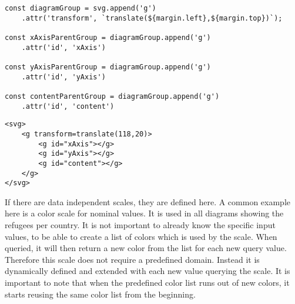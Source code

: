 \begin{minipage}{0.9\linewidth}
\begin{lstlisting}[style=htmlcssjs, captionpos=b, caption={JavaScript code to create the hierarchy as used in the bar-chart. The first line adds a new group element to themain SVG container using the \texttt{append} command. The newly added group element is saved in a constant for later references. Furthermore in line two an attribute is added to the new group element using the \texttt{attr} command and method chaining. It moves the group element from the left and top to allign with the margin definition. In each of the lines four, seven and ten, another group element is added. They are added to the previously created group element. They are all stored in constants for later reference and are provided with id's for easier identification and debugging.}, label={lst:hierarchy_creation}]
const diagramGroup = svg.append('g')
    .attr('transform', `translate(${margin.left},${margin.top})`);

const xAxisParentGroup = diagramGroup.append('g')
    .attr('id', 'xAxis')

const yAxisParentGroup = diagramGroup.append('g')
    .attr('id', 'yAxis')

const contentParentGroup = diagramGroup.append('g')
    .attr('id', 'content')
\end{lstlisting}
\begin{lstlisting}[style=htmlcssjs, captionpos=b, caption={The HTML structure which results from the JavaScript code in listing \ref{lst:hierarchy_creation}. The resulting tree structure clearly separates the different aspects of the diagram. Using a hierarchical approach makes not only later selections easier, but also increases human readability and simplyfies debugging.}, label={lst:hierarchy_result}]
<svg>
    <g transform=translate(118,20)>
        <g id="xAxis"></g>
        <g id="yAxis"></g>
        <g id="content"></g>
    </g>
</svg>
    \end{lstlisting}
\end{minipage}


If there are data independent scales, they are defined here. A common example here is a color scale for nominal values. It is used in all diagrams showing the refugees per country. It is not important to already know the specific input values, to be able to create a list of colors which is used by the scale. When queried, it will then return a new color from the list for each new query value. Therefore this scale does not require a predefined domain. Instead it is dynamically defined and extended with each new value querying the scale. It is important to note that when the predefined color list runs out of new colors, it starts reusing the same color list from the beginning.

